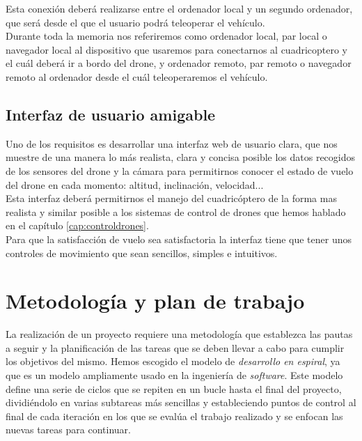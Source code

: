Esta conexión deberá realizarse entre el ordenador local y un segundo ordenador, que será desde el que el usuario podrá teleoperar el vehículo.\\

Durante toda la memoria nos referiremos como ordenador local, par local o navegador local al dispositivo que usaremos para conectarnos al cuadricoptero y el cuál deberá ir a bordo del drone, y ordenador remoto, par remoto o navegador remoto al ordenador desde el cuál teleoperaremos el vehículo.\\


\subsection{Interfaz de usuario amigable}

Uno de los requisitos es desarrollar una interfaz web de usuario clara, que nos muestre de una manera lo más realista, clara y concisa posible los datos recogidos de los sensores del drone y la cámara para permitirnos conocer el estado de vuelo del drone en cada momento: altitud, inclinación, velocidad...\\

Esta interfaz deberá permitirnos el manejo del cuadricóptero de la forma mas realista y similar posible a los sistemas de control de drones que hemos hablado en el capítulo \ref{cap:controldrones}.\\

Para que la satisfacción de vuelo sea satisfactoria la interfaz tiene que tener unos controles de movimiento que sean sencillos, simples e intuitivos.\\

\section{Metodología y plan de trabajo}

La realización de un proyecto requiere una metodología que establezca las pautas a seguir y la planificación de las tareas que se deben llevar a cabo para cumplir los objetivos del mismo. Hemos escogido el modelo de \emph{desarrollo en espiral}, ya que es un modelo ampliamente usado en la ingeniería de \emph{software}. Este modelo define una serie de ciclos que se repiten en un bucle hasta el final del proyecto, dividiéndolo en varias subtareas más sencillas y estableciendo puntos de control al final de cada iteración en los que se evalúa el trabajo realizado y se enfocan las nuevas tareas para continuar.\\


